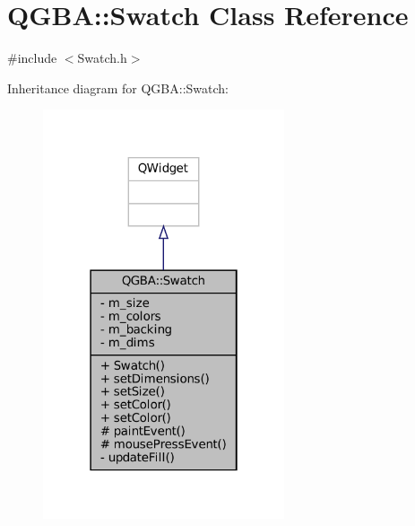 \hypertarget{class_q_g_b_a_1_1_swatch}{}\section{Q\+G\+BA\+:\+:Swatch Class Reference}
\label{class_q_g_b_a_1_1_swatch}


{\ttfamily \#include $<$Swatch.\+h$>$}



Inheritance diagram for Q\+G\+BA\+:\+:Swatch\+:
\nopagebreak
\begin{figure}[H]
\begin{center}
\leavevmode
\includegraphics[width=202pt]{class_q_g_b_a_1_1_swatch__inherit__graph}
\end{center}
\end{figure}


